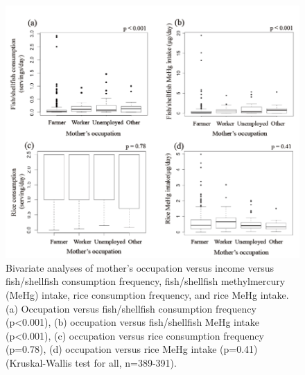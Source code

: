 \begin{figure}
  \centering
    \label{fig:Fig216}
  \includegraphics[scale=1]{Figures/Fig216.pdf}
  \caption[Bivariate analyses of mother's occupation versus income versus fish/shellfish consumption frequency, fish/shellfish methylmercury intake, rice consumption frequency, and rice methylmercury intake]{Bivariate analyses of mother's occupation versus income versus fish/shellfish consumption frequency, fish/shellfish methylmercury (MeHg) intake, rice consumption frequency, and rice MeHg intake. (a) Occupation versus fish/shellfish consumption frequency (p<0.001), (b) occupation versus fish/shellfish MeHg intake (p<0.001), (c) occupation versus rice consumption frequency (p=0.78), (d) occupation versus rice MeHg
intake (p=0.41) (Kruskal-Wallis test for all, n=389-391).}
\end{figure}


